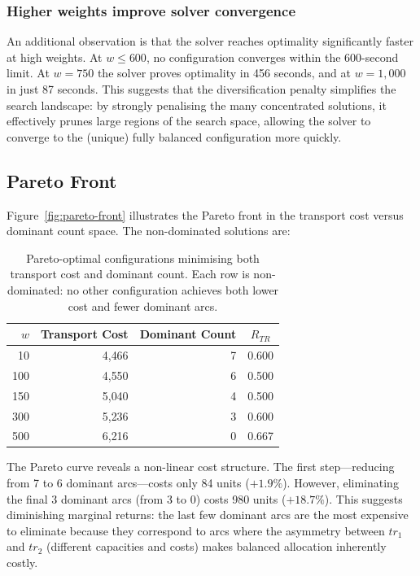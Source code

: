 \documentclass{article}
\begin{document}
\subsubsection{Higher weights improve solver convergence}

An additional observation is that the solver reaches optimality significantly faster at high weights. At $w \leq 600$, no configuration converges within the 600-second limit. At $w=750$ the solver proves optimality in 456 seconds, and at $w=1{,}000$ in just 87 seconds. This suggests that the diversification penalty simplifies the search landscape: by strongly penalising the many concentrated solutions, it effectively prunes large regions of the search space, allowing the solver to converge to the (unique) fully balanced configuration more quickly.

\subsection{Pareto Front}

Figure~\ref{fig:pareto-front} illustrates the Pareto front in the transport cost versus dominant count space. The non-dominated solutions are:

\begin{table}[h]
\centering
\begin{tabular}{|r|r|r|c|}
\hline
$w$ & \textbf{Transport Cost} & \textbf{Dominant Count} & $R_{TR}$ \\
\hline
10  & 4{,}466 & 7 & 0.600 \\
\hline
100 & 4{,}550 & 6 & 0.500 \\
\hline
150 & 5{,}040 & 4 & 0.500 \\
\hline
300 & 5{,}236 & 3 & 0.600 \\
\hline
500 & 6{,}216 & 0 & 0.667 \\
\hline
\end{tabular}
\caption{Pareto-optimal configurations minimising both transport cost and dominant count. Each row is non-dominated: no other configuration achieves both lower cost and fewer dominant arcs.}
\label{tab:pareto-front}
\end{table}

The Pareto curve reveals a non-linear cost structure. The first step---reducing from 7 to 6 dominant arcs---costs only 84 units ($+1.9\%$). However, eliminating the final 3 dominant arcs (from 3 to 0) costs 980 units ($+18.7\%$). This suggests diminishing marginal returns: the last few dominant arcs are the most expensive to eliminate because they correspond to arcs where the asymmetry between $tr_1$ and $tr_2$ (different capacities and costs) makes balanced allocation inherently costly.
\end{document}
